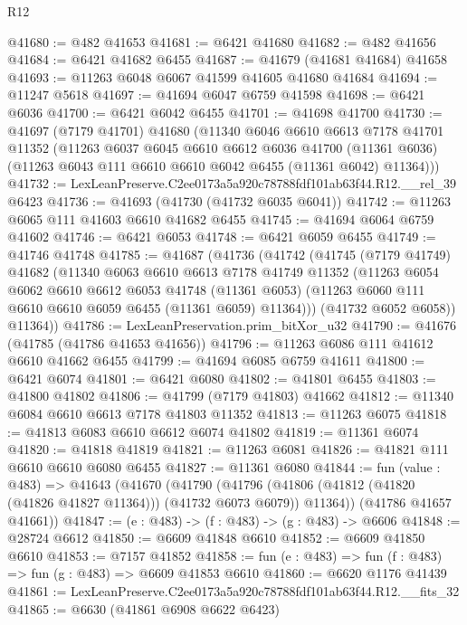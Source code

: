 \begin{lexlean}{R12}
\begin{coremodule}
@41680 := @482 @41653
@41681 := @6421 @41680
@41682 := @482 @41656
@41684 := @6421 @41682 @6455
@41687 := @41679 (@41681 @41684) @41658
@41693 := @11263 @6048 @6067 @41599 @41605 @41680 @41684
@41694 := @11247 @5618
@41697 := @41694 @6047 @6759 @41598
@41698 := @6421 @6036
@41700 := @6421 @6042 @6455
@41701 := @41698 @41700
@41730 := @41697
    (@7179 @41701)
    @41680
    (@11340
      @6046
      @6610
      @6613
      @7178
      @41701
      @11352
      (@11263
        @6037
        @6045
        @6610
        @6612
        @6036
        @41700
        (@11361 @6036)
        (@11263 @6043 @111 @6610 @6610 @6042 @6455 (@11361 @6042) @11364)))
@41732 := LexLeanPreserve.C2ee0173a5a920c78788fdf101ab63f44.R12.__rel_39 @6423
@41736 := @41693 (@41730 (@41732 @6035 @6041))
@41742 := @11263 @6065 @111 @41603 @6610 @41682 @6455
@41745 := @41694 @6064 @6759 @41602
@41746 := @6421 @6053
@41748 := @6421 @6059 @6455
@41749 := @41746 @41748
@41785 := @41687
    (@41736
      (@41742
        (@41745
          (@7179 @41749)
          @41682
          (@11340
            @6063
            @6610
            @6613
            @7178
            @41749
            @11352
            (@11263
              @6054
              @6062
              @6610
              @6612
              @6053
              @41748
              (@11361 @6053)
              (@11263 @6060 @111 @6610 @6610 @6059 @6455 (@11361 @6059) @11364)))
          (@41732 @6052 @6058))
        @11364))
@41786 := LexLeanPreservation.prim_bitXor_u32
@41790 := @41676 (@41785 (@41786 @41653 @41656))
@41796 := @11263 @6086 @111 @41612 @6610 @41662 @6455
@41799 := @41694 @6085 @6759 @41611
@41800 := @6421 @6074
@41801 := @6421 @6080
@41802 := @41801 @6455
@41803 := @41800 @41802
@41806 := @41799 (@7179 @41803) @41662
@41812 := @11340 @6084 @6610 @6613 @7178 @41803 @11352
@41813 := @11263 @6075
@41818 := @41813 @6083 @6610 @6612 @6074 @41802
@41819 := @11361 @6074
@41820 := @41818 @41819
@41821 := @11263 @6081
@41826 := @41821 @111 @6610 @6610 @6080 @6455
@41827 := @11361 @6080
@41844 := fun (value : @483) =>
  @41643
    (@41670
      (@41790
        (@41796 (@41806 (@41812 (@41820 (@41826 @41827 @11364))) (@41732 @6073 @6079)) @11364))
      (@41786 @41657 @41661))
@41847 := (e : @483) -> (f : @483) -> (g : @483) -> @6606
@41848 := @28724 @6612
@41850 := @6609 @41848 @6610
@41852 := @6609 @41850 @6610
@41853 := @7157 @41852
@41858 := fun (e : @483) => fun (f : @483) => fun (g : @483) => @6609 @41853 @6610
@41860 := @6620 @1176 @41439
@41861 := LexLeanPreserve.C2ee0173a5a920c78788fdf101ab63f44.R12.__fits_32
@41865 := @6630 (@41861 @6908 @6622 @6423)

\end{coremodule}
\end{lexlean}
